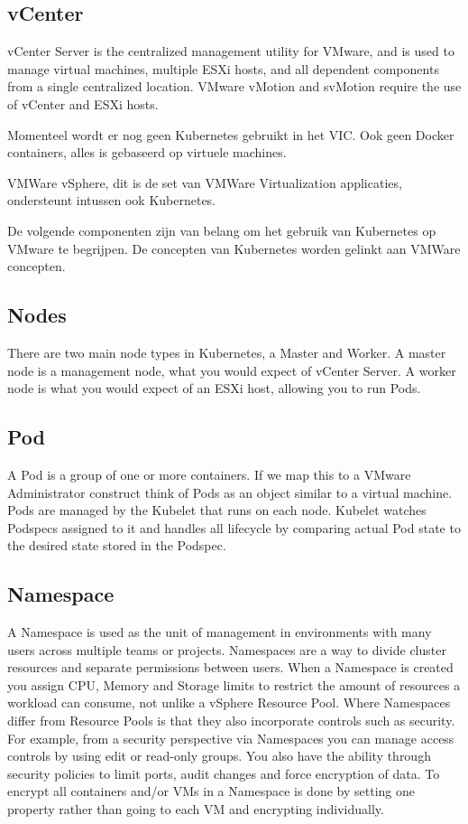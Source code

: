 \subsection{vCenter}
vCenter Server is the centralized management utility for VMware, and is used to manage virtual machines, multiple ESXi hosts, and all dependent components from a single centralized location. VMware vMotion and svMotion require the use of vCenter and ESXi hosts.\autocite{Abbas2023}

Momenteel wordt er nog geen Kubernetes gebruikt in het VIC. Ook geen Docker containers, alles is gebaseerd op virtuele machines.

VMWare vSphere, dit is de set van VMWare Virtualization applicaties, ondersteunt intussen ook Kubernetes.

De volgende componenten zijn van belang om het gebruik van Kubernetes op VMware te begrijpen. De concepten van Kubernetes worden gelinkt aan VMWare concepten.

\subsection{Nodes}
There are two main node types in Kubernetes, a Master and Worker. A master node is a management node, what you would expect of vCenter Server. A worker node is what you would expect of an ESXi host, allowing you to run Pods.\autocite{VMware2019}

\subsection{Pod}
A Pod is a group of one or more containers. If we map this to a VMware Administrator construct think of Pods as an object similar to a virtual machine. Pods are managed by the Kubelet that runs on each node. Kubelet watches Podspecs assigned to it and handles all lifecycle by comparing actual Pod state to the desired state stored in the Podspec.\autocite{VMware2019}

\subsection{Namespace}
A Namespace is used as the unit of management in environments with many users across multiple teams or projects. Namespaces are a way to divide cluster resources and separate permissions between users. When a Namespace is created you assign CPU, Memory and Storage limits to restrict the amount of resources a workload can consume, not unlike a vSphere Resource Pool. Where Namespaces differ from Resource Pools is that they also incorporate controls such as security. For example, from a security perspective via Namespaces you can manage access controls by using edit or read-only groups. You also have the ability through security policies to limit ports, audit changes and force encryption of data. To encrypt all containers and/or VMs in a Namespace is done by setting one property rather than going to each VM and encrypting individually.\autocite{VMware2019}

